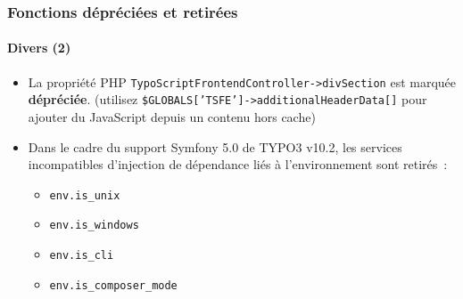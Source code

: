 \begin{frame}[fragile]
	\frametitle{Fonctions dépréciées et retirées}
	\framesubtitle{Divers (2)}

	\lstset{basicstyle=\tiny\ttfamily}

	\begin{itemize}

		\item La propriété PHP \texttt{TypoScriptFrontendController->divSection} est marquée \textbf{dépréciée}.\newline
			\smaller
				(utilisez \texttt{\$GLOBALS['TSFE']->additionalHeaderData[]} pour ajouter du JavaScript depuis un contenu hors cache)
			\normalsize

		\item Dans le cadre du support Symfony 5.0 de TYPO3 v10.2, les services incompatibles d'injection de dépendance
			liés à l'environnement sont retirés~:

			\begin{itemize}
				\item \texttt{env.is\_unix}
				\item \texttt{env.is\_windows}
				\item \texttt{env.is\_cli}
				\item \texttt{env.is\_composer\_mode}
			\end{itemize}

	\end{itemize}

\end{frame}

